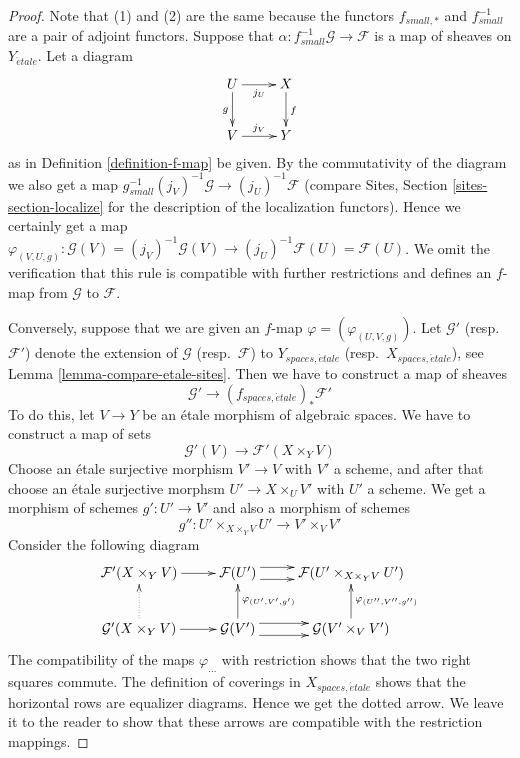 \begin{proof}
Note that (1) and (2) are the same because the functors $f_{small, *}$
and $f_{small}^{-1}$ are a pair of adjoint functors.
Suppose that $\alpha : f_{small}^{-1}\mathcal{G} \to \mathcal{F}$
is a map of sheaves on $Y_{\acute{e}tale}$. Let a diagram
$$
\xymatrix{
U \ar[d]_g \ar[r]_{j_U} & X \ar[d]^f \\
V \ar[r]^{j_V} & Y
}
$$
as in Definition \ref{definition-f-map} be given.
By the commutativity of the diagram we also get a map
$g_{small}^{-1}(j_V)^{-1}\mathcal{G} \to (j_U)^{-1}\mathcal{F}$
(compare Sites, Section \ref{sites-section-localize} for the
description of the localization functors). Hence we certainly
get a map
$\varphi_{(V, U, g)} :
\mathcal{G}(V) = (j_V)^{-1}\mathcal{G}(V)
\to
(j_U)^{-1}\mathcal{F}(U) = \mathcal{F}(U)$.
We omit the verification that this rule is compatible with
further restrictions and defines an $f$-map from $\mathcal{G}$ to
$\mathcal{F}$.

\medskip\noindent
Conversely, suppose that we are given an $f$-map
$\varphi = (\varphi_{(U, V, g)})$.
Let $\mathcal{G}'$ (resp.\ $\mathcal{F}'$) denote the extension of
$\mathcal{G}$ (resp.\ $\mathcal{F}$) to $Y_{spaces, \acute{e}tale}$
(resp.\ $X_{spaces, \acute{e}tale}$), see
Lemma \ref{lemma-compare-etale-sites}.
Then we have to construct a map of sheaves
$$
\mathcal{G}' \longrightarrow (f_{spaces, \acute{e}tale})_*\mathcal{F}'
$$
To do this, let $V \to Y$ be an \'etale morphism of algebraic spaces.
We have to construct a map of sets
$$
\mathcal{G}'(V) \to \mathcal{F}'(X \times_Y V)
$$
Choose an \'etale surjective morphism $V' \to V$ with $V'$ a scheme,
and after that choose an \'etale surjective morphsm
$U' \to X \times_U V'$ with $U'$ a scheme. We get a morphism of
schemes $g' : U' \to V'$ and also a morphism of schemes
$$
g'' : U' \times_{X \times_Y V} U' \longrightarrow V' \times_V V'
$$
Consider the following diagram
$$
\xymatrix{
\mathcal{F}'(X \times_Y V) \ar[r] &
\mathcal{F}(U') \ar@<1ex>[r] \ar@<-1ex>[r] &
\mathcal{F}(U' \times_{X \times_Y V} U') \\
\mathcal{G}'(X \times_Y V) \ar[r] \ar@{..>}[u] &
\mathcal{G}(V') \ar@<1ex>[r] \ar@<-1ex>[r] \ar[u]_{\varphi_{(U', V', g')}} &
\mathcal{G}(V' \times_V V') \ar[u]_{\varphi_{(U'', V'', g'')}}
}
$$
The compatibility of the maps $\varphi_{...}$
with restriction shows that the two right squares commute.
The definition of coverings in $X_{spaces, \acute{e}tale}$ shows that
the horizontal rows are equalizer diagrams. Hence we get
the dotted arrow. We leave it to the reader to show that these
arrows are compatible with the restriction mappings.
\end{proof}

